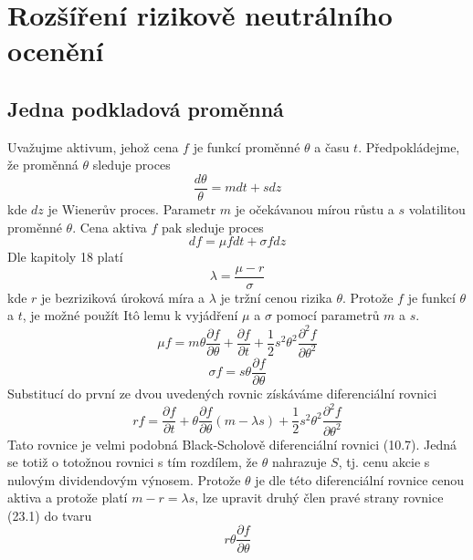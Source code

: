 \documentclass[a4paper]{book}
\begin{document}
\section{Rozšíření rizikově neutrálního ocenění}

\subsection{Jedna podkladová proměnná}

Uvažujme aktivum, jehož cena $f$ je funkcí proměnné $\theta$ a času $t$. Předpokládejme, že proměnná $\theta$ sleduje proces
\begin{equation*}
\frac{d \theta}{\theta} = m dt + s dz
\end{equation*}
kde $dz$ je Wienerův proces. Parametr $m$ je očekávanou mírou růstu a $s$ volatilitou proměnné $\theta$. Cena aktiva $f$ pak sleduje proces
\begin{equation*}
d f = \mu f dt + \sigma f dz
\end{equation*}
Dle kapitoly 18 platí
\begin{equation*}
\lambda = \frac{\mu - r}{\sigma}
\end{equation*}
kde $r$ je bezriziková úroková míra a $\lambda$ je tržní cenou rizika $\theta$. Protože $f$ je funkcí $\theta$ a $t$, je možné použít It\^o lemu k vyjádření $\mu$ a $\sigma$ pomocí parametrů $m$ a $s$.
\begin{equation*}
\mu f = m \theta \frac{\partial f}{\partial \theta} + \frac{\partial f}{\partial t} + \frac{1}{2}s^2 \theta^2 \frac{\partial^2 f}{\partial \theta^2}
\end{equation*}
\begin{equation*}
\sigma f = s \theta \frac{\partial f}{\partial \theta}
\end{equation*}
Substitucí do první ze dvou uvedených rovnic získáváme diferenciální rovnici
\begin{equation}
rf = \frac{\partial f}{\partial t} + \theta \frac{\partial f}{\partial \theta}(m-\lambda s) + \frac{1}{2}s^2\theta^2\frac{\partial^2 f}{\partial \theta^2}
\end{equation}
Tato rovnice je velmi podobná Black-Scholově diferenciální rovnici (10.7). Jedná se totiž o totožnou rovnici s tím rozdílem, že $\theta$ nahrazuje $S$, tj. cenu akcie s nulovým dividendovým výnosem. Protože $\theta$ je dle této diferenciální rovnice cenou aktiva a protože platí $m - r = \lambda s$, lze upravit druhý člen pravé strany rovnice (23.1) do tvaru
\begin{equation*}
r\theta \frac{\partial f}{\partial \theta}
\end{equation*}
\end{document}
